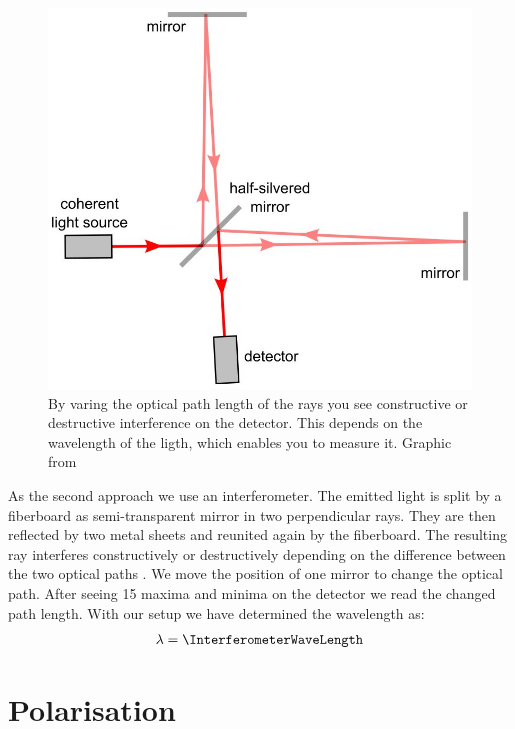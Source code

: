 \documentclass[a4paper,10pt,twocolumn]{article}
\begin{document}
    \begin{figure}[htbp]
        \includegraphics[width=0.9\linewidth]{Interferometer}
        \center
        \caption{By varing the optical path length of the rays you see constructive or destructive interference on the
        detector. This depends on the wavelength of the ligth, which enables you to measure it.
        Graphic from~\cite{imageMichelsonInterferometerWiki}}
        \label{fig:Interferometer}
    \end{figure}
    
    As the second approach we use an interferometer.
    The emitted light is split by a fiberboard as semi-transparent mirror in two perpendicular rays.
    They are then reflected by two metal sheets and reunited again by the fiberboard. 
    The resulting ray interferes constructively or destructively depending on the difference between the two optical paths .
    We move the position of one mirror to change the optical path.
    After seeing 15 maxima and minima on the detector we read the changed
    path length.
    With our setup we have determined the wavelength as:
    \begin{align*}
        \lambda = \InterferometerWaveLength
    \end{align*}
    \section{Polarisation}

    
\end{document}
